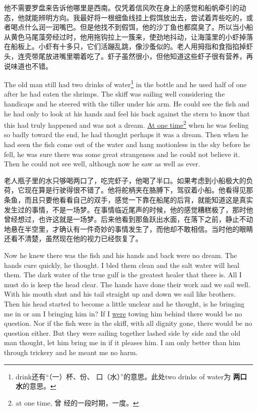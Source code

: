 \begin{paracol}{2}
\switchcolumn

他不需要罗盘来告诉他哪里是西南。仅凭着信风吹在身上的感觉和船帆牵引的动态，他就能辨明方向。我最好将一根细鱼线挂上假饵放出去，尝试着弄些吃的，或者喝点什么润一润嘴巴。但是他找不到假饵，他的沙丁鱼也都腐臭了。所以当小船从黄色马尾藻旁经过时，他用拖钩拉上一簇来，使劲地抖动，让海藻里的小虾掉落在船板上。小虾有十多只，它们活蹦乱跳，像沙蚤似的。老人用拇指和食指掐掉虾头，连壳带尾放进嘴里嚼着吃了。虾子虽然很小，但他知道这些虾子很有营养，再说味道也不错。

\switchcolumn*

The old man still had two drinks of water\footnote{drink还有“（一）杯、份、
  口（水）”的意思。此处two drinks of water为 \textbf{两口水}的意思。} in
the bottle and he used half of one after he had eaten the shrimps. The skiff
was sailing well considering the \glspl{handicap} and he \gls{steered}
with the \gls{tiller} under his arm. He could see the fish and he had only
to look at his hands and feel his back against the stern to know that this
had truly happened and was not a dream. \uline{At one time}\footnote{at one time, 曾
  经的一段时期，一度。} when he was feeling so badly toward the end, he had
thought perhaps it was a dream. Then when he had seen the fish come out of
the water and hang \gls{motionless} in the sky before he fell, he was sure
there was some great \gls{strangeness} and he could not believe it. Then
he could not see well, although now he saw as well as ever.

\switchcolumn

老人瓶子里的水只够喝两口了，吃完虾子，他喝了半口。如果考虑到小船极大的负荷，它现在算是行驶得很不错了。他将舵柄夹在胳膊下，驾驭着小船。他看得见那条鱼，而且只要他看看自己的双手，感觉一下靠在船尾的后背，就能知道这是真实发生过的事情，不是一场梦。在事情临近尾声的时候，他的感觉糟糕极了，那时他曾经想过，也许这就是一场梦。后来他看到那鱼跃出水面，在落下之前，静止不动地悬在半空里，才确认有一件奇妙的事情发生了，而他却不敢相信。当时他的眼睛还看不清楚，虽然现在他的视力已经恢复了。

\switchcolumn*

Now he knew there was the fish and his hands and back were no dream. The
hands \gls{cure} quickly, he thought. I \gls{bled} them clean and the
salt water will \gls{heal} them. The dark water of the true gulf is the
greatest \gls{healer} that there is. All I must do is keep the head clear.
The hands have done their work and we sail well. With his mouth shut and his
tail straight up and down we sail like brothers. Then his head started to
become a little unclear and he thought, is he bringing me in or am I
bringing him in? If I \uline{were} \gls{towing} him behind there would be no
question. Nor if the fish were in the skiff, with all dignity gone, there
would be no question either. But they were sailing together lashed side by
side and the old man thought, let him bring me in if it pleases him. I am
only better than him through \gls{trickery} and he meant me no \gls{harm}.


\end{paracol}
